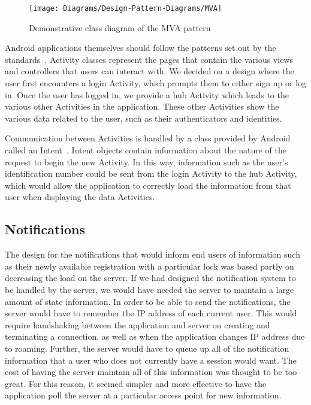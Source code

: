 \documentclass[12pt]{report}
\let\Oldsubsection\subsection
\renewcommand{\subsection}{\FloatBarrier\Oldsubsection}
\begin{document}
\begin{figure}
    \centering
    \texttt{[image: Diagrams/Design-Pattern-Diagrams/MVA]}
    \caption{Demonstrative class diagram of the MVA pattern}
    \label{fig:MVA}
\end{figure}

Android applications themselves should follow the patterns set out by the standards~\autocite{ANDROIDSTANDARD}. Activity classes represent the
pages that contain the various views and controllers that users can interact with. We decided on a design where the user
first encounters a login Activity, which prompts them to either sign up or log in. Once the user has logged in, we
provide a hub Activity which leads to the various other Activities in the application. These other Activities show the
various data related to the user, such as their authenticators and identities.

Communication between Activities is handled by a class provided by Android called an Intent~\autocite{ANDROIDINTENT}. Intent objects contain
information about the nature of the request to begin the new Activity. In this way, information such as the user's
identification number could be sent from the login Activity to the hub Activity, which would allow the application to
correctly load the information from that user when displaying the data Activities.


\subsection{Notifications} \label{notifications}

The design for the notifications that would inform end users of information such as their newly available registration
with a particular lock was based partly on decreasing the load on the server. If we had designed the notification system to
be handled by the server, we would have needed the server to maintain a large amount of state information. In order to
be able to send the notifications, the server would have to remember the IP address of each current user. This would
require handshaking between the application and server on creating and terminating a connection, as well as when the
application changes IP address due to roaming. Further, the server would have to queue up all of the notification
information that a user who does not currently have a session would want. The cost of having the server maintain all of this
information was thought to be too great. For this reason, it seemed simpler and more effective to have the
application poll the server at a particular access point for new information.
\end{document}
